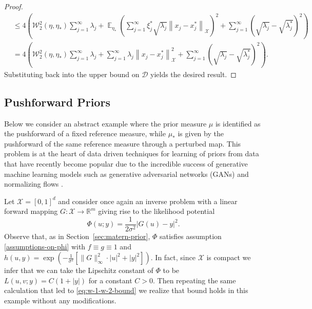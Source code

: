 \documentclass[final]{siamart171218}
\newcommand{\bhtodo}[1]{\todo[linecolor=red,backgroundcolor=red!25,bordercolor=red]{#1}}
\newcommand{\mcl}{\mathcal}
\newcommand{\mbb}{\mathbb}
\newcommand{\R}{\mbb{R}}
\newcommand{\mX}{\mcl{X}}
\DeclareMathOperator{\E}{\mathbb E}
\newcommand{\K}{\mathcal{D}}
\newcommand{\W}{\mathcal{W}}
\begin{document}
\begin{proof}
\begin{equation*}
\begin{aligned}
    & \le  4 \left(  \W_2^2(\eta, \eta_\ast) \sum_{j=1}^\infty \lambda_j + 
     \E_{\eta_\ast}   \left(  \sum_{j=1}^\infty \xi^\ast_j \sqrt{\lambda_j}  \left\|  x_j - x_j^\ast \right\|_\mX \right)^2
    +  \sum_{j=1}^\infty (\sqrt{\lambda_j} - \sqrt{\lambda_j^\ast})^2 \right) \\
    & =   4 \left(  \W_2^2(\eta, \eta_\ast) \sum_{j=1}^\infty \lambda_j +   \sum_{j=1}^\infty  \lambda_j  \left\|  x_j - x_j^\ast \right\|_\mX^2
    +  \sum_{j=1}^\infty (\sqrt{\lambda_j} - \sqrt{\lambda_j^\ast})^2 \right).
  \end{aligned}
\end{equation*}
Substituting  back into the upper bound on $\K$ yields the desired result.
{}
\end{proof}


\subsection{Pushforward Priors}\label{sec:pushforward-prior}

Below we consider an abstract example where the prior measure $\mu$ is identified as 
the pushforward of a fixed reference measure, while $\mu_\ast$ is given by 
the pushforward of the same reference measure through a perturbed map. 
This problem is at the heart of data driven techniques for learning of priors from 
data that have  recently become popular \cite{patel2022solution, gonzalez2022solving, laumont2022bayesian} due to the incredible success of 
generative machine learning models such as generative adversarial networks (GANs) \cite{goodfellow2020generative}
and normalizing flows \cite{kobyzev2020normalizing}.


Let $\mX = [0,1]^d$
and consider once again an inverse problem with a linear 
forward mapping $G : \mX \to \R^m$ giving rise to the likelihood potential
\begin{equation*}
	\Phi(u; y) = \frac{1}{2\sigma^2} |G(u) - y|^2.
\end{equation*}
 Observe that, as in Section~\ref{sec:matern-prior}, $\Phi$ satisfies assumption \ref{assumptions-on-phi} with $f\equiv g \equiv 1$ and 
 $h(u,y) = \exp\left( - \frac{1}{\sigma^2} \left[  \|G\|_\infty^2 \cdot |u|^2 + |y|^2 \right] \right)  $.
 In fact, since $\mX$ is compact we infer that  we can 
take  the Lipschitz constant of $\Phi$ to be $L(u,v; y) = C( 1 + |y|)$ for a constant $C> 0$. 
Then repeating the same calculation that led to \eqref{eq:w-1-w-2-bound} we 
realize that bound holds in this example without any modifications.
\end{document}
